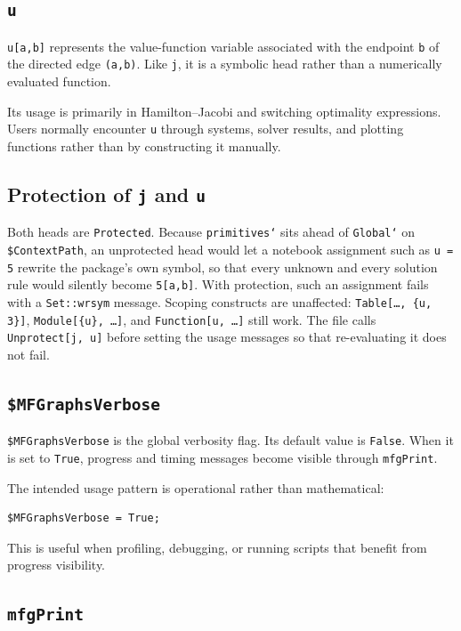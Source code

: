 \documentclass[11pt]{article}
\begin{document}
\subsection*{\texttt{u}}

\texttt{u[a,b]} represents the value-function variable associated with the endpoint \texttt{b} of the directed edge \texttt{(a,b)}. Like \texttt{j}, it is a symbolic head rather than a numerically evaluated function.

Its usage is primarily in Hamilton--Jacobi and switching optimality expressions. Users normally encounter \texttt{u} through systems, solver results, and plotting functions rather than by constructing it manually.

\subsection*{Protection of \texttt{j} and \texttt{u}}

Both heads are \texttt{Protected}. Because \texttt{primitives`} sits ahead of \texttt{Global`} on \texttt{\$ContextPath}, an unprotected head would let a notebook assignment such as \texttt{u = 5} rewrite the package's own symbol, so that every unknown and every solution rule would silently become \texttt{5[a,b]}. With protection, such an assignment fails with a \texttt{Set::wrsym} message. Scoping constructs are unaffected: \texttt{Table[\ldots, \{u, 3\}]}, \texttt{Module[\{u\}, \ldots]}, and \texttt{Function[u, \ldots]} still work. The file calls \texttt{Unprotect[j, u]} before setting the usage messages so that re-evaluating it does not fail.

\subsection*{\texttt{\$MFGraphsVerbose}}

\texttt{\$MFGraphsVerbose} is the global verbosity flag. Its default value is \texttt{False}. When it is set to \texttt{True}, progress and timing messages become visible through \texttt{mfgPrint}.

The intended usage pattern is operational rather than mathematical:

\begin{verbatim}
$MFGraphsVerbose = True;
\end{verbatim}

This is useful when profiling, debugging, or running scripts that benefit from progress visibility.

\subsection*{\texttt{mfgPrint}}
\end{document}
